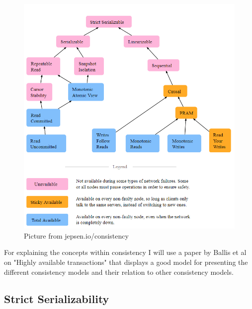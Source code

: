 \documentclass[a4paper,10pt,titlepage]{report}
\begin{document}
    \begin{figure}
        \centering
        \includegraphics[scale=0.4]{images/consistency models.PNG}
        \caption{Picture from jepsen.io/consistency}
        \label{fig:jepsenioconsistency}
    \end{figure}

    For explaining the concepts within consistency I will use a paper by Ballis et al on "Highly available transactions"\cite{HighlyAvailableTransactionsVirtuesandLimitations} that displays a good model for presenting the different consistency models and their relation to other consistency models.\\

    \subsection{Strict Serializability}
\end{document}
